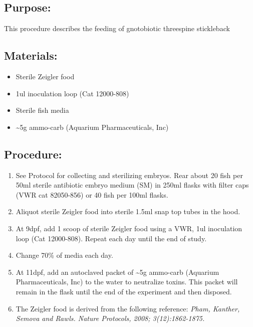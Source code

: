 \documentclass[
]{book}
\providecommand{\tightlist}{%
  \setlength{\itemsep}{0pt}\setlength{\parskip}{0pt}}
\begin{document}
\hypertarget{purpose-7}{%
\subsection{Purpose:}\label{purpose-7}}

This procedure describes the feeding of gnotobiotic threespine stickleback

\hypertarget{materials-13}{%
\subsection{Materials:}\label{materials-13}}

\begin{itemize}
\tightlist
\item
  Sterile Zeigler food
\item
  1ul inoculation loop (Cat 12000-808)
\item
  Sterile fish media
\item
  \textasciitilde5g ammo-carb (Aquarium Pharmaceuticals, Inc)
\end{itemize}

\hypertarget{procedure-17}{%
\subsection{Procedure:}\label{procedure-17}}

\begin{enumerate}
\def\labelenumi{\arabic{enumi}.}
\tightlist
\item
  See Protocol for collecting and sterilizing embryos. Rear about 20 fish per 50ml sterile antibiotic embryo medium (SM) in 250ml flasks with filter caps (VWR cat 82050-856) or 40 fish per 100ml flasks.
\item
  Aliquot sterile Zeigler food into sterile 1.5ml snap top tubes in the hood.
\item
  At 9dpf, add 1 scoop of sterile Zeigler food using a VWR, 1ul inoculation loop (Cat 12000-808). Repeat each day until the end of study.
\item
  Change 70\% of media each day.
\item
  At 11dpf, add an autoclaved packet of \textasciitilde5g ammo-carb (Aquarium Pharmaceuticals, Inc) to the water to neutralize toxins. This packet will remain in the flask until the end of the experiment and then disposed.
\item
  The Zeigler food is derived from the following reference:
  \emph{Pham, Kanther, Semova and Rawls. Nature Protocols, 2008; 3(12):1862-1875.}
\end{enumerate}
\end{document}
